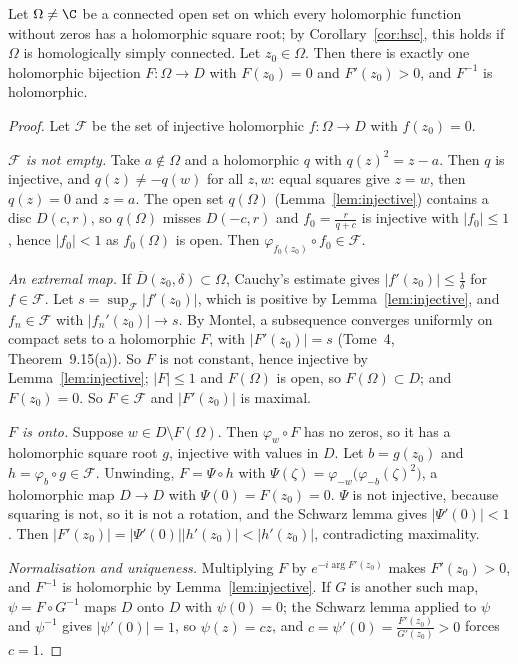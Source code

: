 \begin{theorem}\label{thm:riemannmap}
Let $\Omega\ne\C$ be a connected open set on which every holomorphic function without zeros has a holomorphic square root; by Corollary~\ref{cor:hsc}, this holds if $\Omega$ is homologically simply
connected. Let $z_0\in\Omega$. Then there is exactly one holomorphic bijection $F:\Omega\to D$ with $F(z_0)=0$ and $F'(z_0)>0$, and $F^{-1}$ is holomorphic.
\end{theorem}
\begin{proof}
Let $\mathcal F$ be the set of injective holomorphic $f:\Omega\to D$ with $f(z_0)=0$.

\emph{$\mathcal F$ is not empty.} Take $a\notin\Omega$ and a holomorphic $q$ with $q(z)^2=z-a$. Then $q$ is injective, and $q(z)\ne-q(w)$ for all $z,w$: equal squares give $z=w$, then $q(z)=0$ and $z=a$. The open
set $q(\Omega)$ (Lemma~\ref{lem:injective}) contains a disc $D(c,r)$, so $q(\Omega)$ misses $D(-c,r)$ and $f_0=\frac r{q+c}$ is injective with $|f_0|\le1$, hence $|f_0|<1$ as $f_0(\Omega)$ is open. Then $\varphi_{f_0(z_0)}\circ f_0\in\mathcal F$.

\emph{An extremal map.} If $\overline D(z_0,\delta)\subset\Omega$, Cauchy's estimate gives $|f'(z_0)|\le\frac1\delta$ for $f\in\mathcal F$. Let $s=\sup_{\mathcal F}|f'(z_0)|$, which is positive by Lemma~\ref{lem:injective}, and $f_n\in\mathcal F$ with
$|f_n'(z_0)|\to s$. By Montel, a subsequence converges uniformly on compact sets to a holomorphic $F$, with $|F'(z_0)|=s$ (Tome~4, Theorem~9.15(a)). So $F$ is not constant, hence injective by
Lemma~\ref{lem:injective}; $|F|\le1$ and $F(\Omega)$ is open, so $F(\Omega)\subset D$; and $F(z_0)=0$. So $F\in\mathcal F$ and $|F'(z_0)|$ is maximal.

\emph{$F$ is onto.} Suppose $w\in D\setminus F(\Omega)$. Then $\varphi_w\circ F$ has no zeros, so it has a holomorphic square root $g$, injective with values in $D$. Let $b=g(z_0)$ and $h=\varphi_b\circ g\in\mathcal F$.
Unwinding, $F=\Psi\circ h$ with $\Psi(\zeta)=\varphi_{-w}\bigl(\varphi_{-b}(\zeta)^2\bigr)$, a holomorphic map $D\to D$ with $\Psi(0)=F(z_0)=0$. $\Psi$ is not injective, because squaring is not, so it is not a rotation,
and the Schwarz lemma gives $|\Psi'(0)|<1$. Then $|F'(z_0)|=|\Psi'(0)||h'(z_0)|<|h'(z_0)|$, contradicting maximality.

\emph{Normalisation and uniqueness.} Multiplying $F$ by $e^{-i\arg F'(z_0)}$ makes $F'(z_0)>0$, and $F^{-1}$ is holomorphic by Lemma~\ref{lem:injective}. If $G$ is another such map, $\psi=F\circ G^{-1}$ maps $D$
onto $D$ with $\psi(0)=0$; the Schwarz lemma applied to $\psi$ and $\psi^{-1}$ gives $|\psi'(0)|=1$, so $\psi(z)=cz$, and $c=\psi'(0)=\frac{F'(z_0)}{G'(z_0)}>0$ forces $c=1$.
\end{proof}

